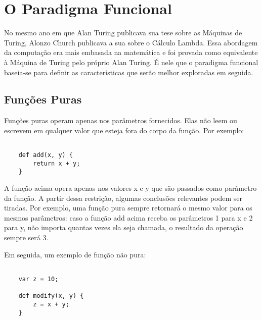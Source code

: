 \chapter{O Paradigma Funcional}



No mesmo ano em que Alan Turing publicava sua 
tese sobre as Máquinas de Turing, Alonzo Church publicava 
a sua sobre o Cálculo Lambda. Essa abordagem da computação 
era mais embasada na matemática e foi provada como 
equivalente à Máquina de Turing pelo próprio Alan Turing. 
É nele que o paradigma funcional 
baseia-se para definir as características que serão 
melhor exploradas em seguida.



\section{Funções Puras}

Funções puras operam apenas nos parâmetros fornecidos. 
Elas não leem ou escrevem em qualquer valor que esteja 
fora do corpo da função.\cite{purefunctionscala} \cite{functionalscala} Por exemplo:

\begin{lstlisting}[caption={Exemplo de Função Pura},label=purefunction]

    def add(x, y) {
        return x + y;
    }

\end{lstlisting}

A função acima opera apenas nos valores x e y que 
são passados como parâmetro da função. A partir 
dessa restrição, algumas conclusões relevantes podem 
ser tiradas. Por exemplo, uma função pura sempre 
retornará o mesmo valor para os mesmos parâmetros: 
caso a função add acima receba os parâmetros 1 para x 
e 2 para y, não importa quantas vezes ela seja chamada, 
o resultado da operação sempre será 3. \cite{functionalscala}

Em seguida, um exemplo de função não pura:

\begin{lstlisting}[caption={Exemplo de Função Pura},label=purefunction]

    var z = 10;

    def modify(x, y) {
        z = x + y;
    }

\end{lstlisting}

